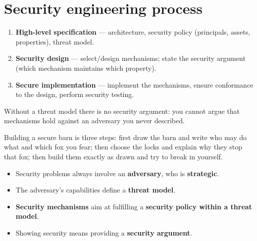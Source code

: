 \section{Security engineering process}

\begin{algbox}[title=Three-stage process]
\begin{enumerate}
  \item \textbf{High-level specification} — architecture, security policy (principals, assets, properties), threat model.
  \item \textbf{Security design} — select/design mechanisms; state the security argument (which mechanism maintains which property).
  \item \textbf{Secure implementation} — implement the mechanisms, ensure conformance to the design, perform security testing.
\end{enumerate}
\end{algbox}

\begin{rembox}[title=Why the threat model comes first]
Without a threat model there is no security argument: you cannot argue that mechanisms hold
against an adversary you never described.
\end{rembox}

\begin{goatbox}
Building a secure barn is three steps: first draw the barn and write who may do what and which
fox you fear; then choose the locks and explain why they stop that fox; then build them exactly as
drawn and try to break in yourself.
\end{goatbox}

\begin{keybox}[title=Summary]
\begin{itemize}
  \item Security problems always involve an \textbf{adversary}, who is \textbf{strategic}.
  \item The adversary's capabilities define a \textbf{threat model}.
  \item \textbf{Security mechanisms} aim at fulfilling a \textbf{security policy within a threat model}.
  \item Showing security means providing a \textbf{security argument}.
\end{itemize}
\end{keybox}

